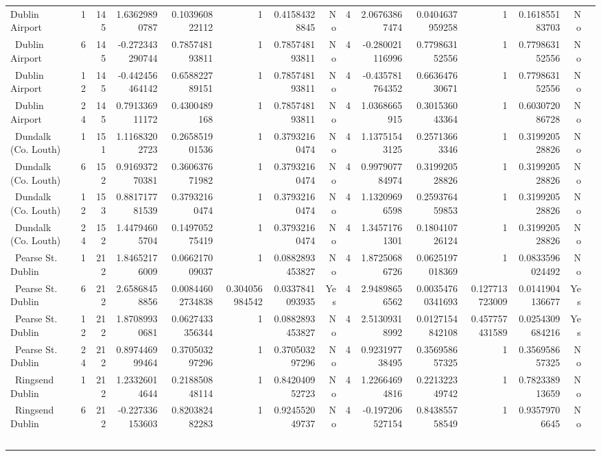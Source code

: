 \documentclass[10pt]{article}
\begin{document}
\begin{longtable}{@{}p{3.45cm}rrr rrrrr rrrrrr@{}}
Dublin Airport & 1 & 145 & 1.63629890787 & 0.103960822112 & 1 & 0.41584328845 & No & 4 & 2.06763867474 & 0.0404637959258 & 1 & 0.161855183703 & No \\\
Dublin Airport & 6 & 145 & -0.272343290744 & 0.785748193811 & 1 & 0.785748193811 & No & 4 & -0.280021116996 & 0.779863152556 & 1 & 0.779863152556 & No \\\
Dublin Airport & 12 & 145 & -0.442456464142 & 0.658822789151 & 1 & 0.785748193811 & No & 4 & -0.435781764352 & 0.663647630671 & 1 & 0.779863152556 & No \\\
Dublin Airport & 24 & 145 & 0.791336911172 & 0.4300489168 & 1 & 0.785748193811 & No & 4 & 1.0368665915 & 0.301536043364 & 1 & 0.603072086728 & No \\\
Dundalk (Co. Louth) & 1 & 151 & 1.11683202723 & 0.265851901536 & 1 & 0.37932160474 & No & 4 & 1.13751543125 & 0.25713663346 & 1 & 0.319920528826 & No \\\
Dundalk (Co. Louth) & 6 & 152 & 0.916937270381 & 0.360637671982 & 1 & 0.37932160474 & No & 4 & 0.997907784974 & 0.319920528826 & 1 & 0.319920528826 & No \\\
Dundalk (Co. Louth) & 12 & 153 & 0.881717781539 & 0.37932160474 & 1 & 0.37932160474 & No & 4 & 1.13209696598 & 0.259376459853 & 1 & 0.319920528826 & No \\\
Dundalk (Co. Louth) & 24 & 152 & 1.44794605704 & 0.149705275419 & 1 & 0.37932160474 & No & 4 & 1.34571761301 & 0.180410726124 & 1 & 0.319920528826 & No \\\
Pearse St. Dublin & 1 & 212 & 1.84652176009 & 0.066217009037 & 1 & 0.0882893453827 & No & 4 & 1.87250686726 & 0.0625197018369 & 1 & 0.0833596024492 & No \\\
Pearse St. Dublin & 6 & 212 & 2.65868458856 & 0.00844602734838 & 0.304056984542 & 0.0337841093935 & Yes & 4 & 2.94898656562 & 0.00354760341693 & 0.127713723009 & 0.0141904136677 & Yes \\\
Pearse St. Dublin & 12 & 212 & 1.87089930681 & 0.0627433356344 & 1 & 0.0882893453827 & No & 4 & 2.51309318992 & 0.0127154842108 & 0.457757431589 & 0.0254309684216 & Yes \\\
Pearse St. Dublin & 24 & 212 & 0.897446999464 & 0.370503297296 & 1 & 0.370503297296 & No & 4 & 0.923197738495 & 0.356958657325 & 1 & 0.356958657325 & No \\\
Ringsend Dublin & 1 & 212 & 1.23326014644 & 0.218850848114 & 1 & 0.842040952723 & No & 4 & 1.22664694816 & 0.221322349742 & 1 & 0.782338913659 & No \\\
Ringsend Dublin & 6 & 212 & -0.227336153603 & 0.820382482283 & 1 & 0.924552049737 & No & 4 & -0.197206527154 & 0.843855758549 & 1 & 0.93579706645 & No \\\

\end{longtable}
\end{document}
